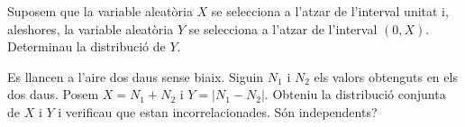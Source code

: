 \begin{prob}
{Suposem que la variable aleat\`oria $X$ se selecciona a l'atzar de 
l'interval unitat i, aleshores, la variable aleat\`oria $Y$ se selecciona 
a l'atzar de l'interval $(0,X)$. Determinau la distribuci\'o de $Y$.}
\end{prob}

\begin{prob}
{Es llancen a l'aire dos daus sense biaix. Siguin $N_1$ i $N_2$ els 
valors obtenguts en els dos daus. Posem $X=N_1+N_2$ i $Y=|N_1-N_2|$. 
Obteniu la distribuci\'o conjunta de $X$ i $Y$ i verificau que estan 
incorrelacionades. S\'on independents?}
\end{prob}

